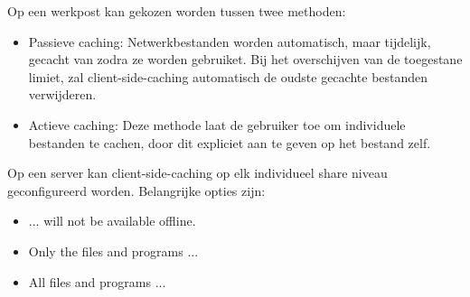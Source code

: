 \begin{enumerate}
{\begin{itemize}
                Op een werkpost kan gekozen worden tussen twee methoden:
                \begin{itemize}
                    \item Passieve caching: Netwerkbestanden worden automatisch, maar tijdelijk, gecacht van zodra ze worden gebruiket. Bij het overschijven van de toegestane limiet, zal client-side-caching automatisch de oudste gecachte bestanden verwijderen.
                    \item Actieve caching: Deze methode laat de gebruiker toe om individuele bestanden te cachen, door dit expliciet aan te geven op het bestand zelf.
                \end{itemize}

                Op een server kan client-side-caching op elk individueel share niveau geconfigureerd worden. Belangrijke opties zijn:
                \begin{itemize}
                    \item ... will not be available offline.
                    \item Only the files and programs ...
                    \item All files and programs ...
                \end{itemize}
			\end{itemize}
		}
		
		 { }
		

\end{enumerate}
